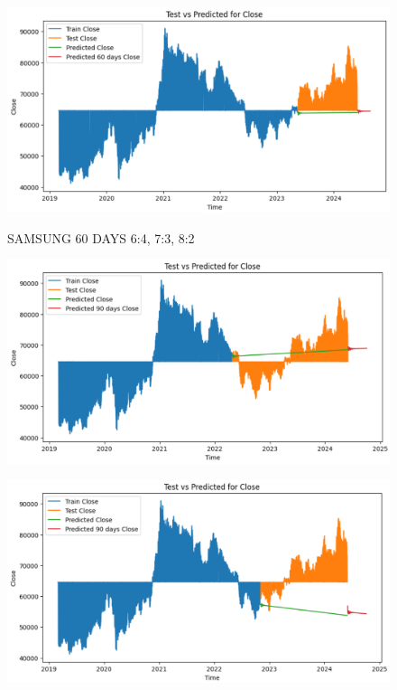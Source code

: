 \documentclass{article}
\begin{document}
\begin{multicols}{2}
\begin{figure}[H]
\begin{minipage}{0.15\textwidth}
    \label{fig:2}
    \end{minipage}%
    \begin{minipage}{0.15\textwidth}
    \centering
    \includegraphics[width=1\textwidth]{Image/VARMA/SAMSUNG/8_2/60.png}

    \label{fig:3}
    \end{minipage}
    \caption{SAMSUNG 60 DAYS  6:4, 7:3, 8:2 }
\end{figure}

\begin{figure}[H]
    \centering
    \begin{minipage}{0.15\textwidth}
    \centering
    \includegraphics[width=1\textwidth]{Image/VARMA/SAMSUNG/6_4/90.png}
   
    \label{fig:1}
    \end{minipage}%
    \begin{minipage}{0.15\textwidth}
    \centering
    \includegraphics[width=1\textwidth]{Image/VARMA/SAMSUNG/7_3/90.png}
  

\end{minipage}
\end{figure}
\end{multicols}
\end{document}
